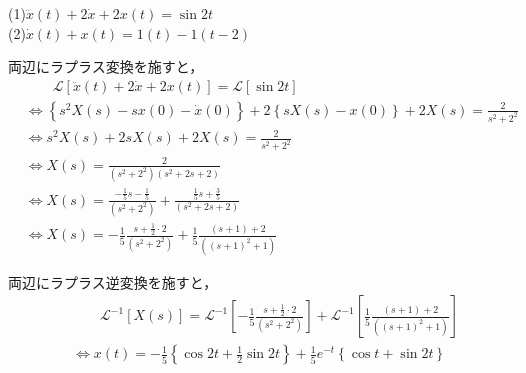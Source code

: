 \documentclass[a4paper,12pt]{article}
\begin{document}
(1)\quad \( \ddot{x}(t)+ 2\dot{x}+ 2x(t)= \sin 2t \)\\

(2)\quad \( \dot{x}(t)+ x(t)= 1(t)- 1(t-2) \)\\

\vspace{2mm}

\begin{tcolorbox}[title={6.(1) \( \ddot{x}(t)+ 2\dot{x}+ 2x(t)= \sin 2t \)
    }]
    \quad 両辺にラプラス変換を施すと，
    \vspace{-3mm}
    \begin{align*}
        &\qquad \mathcal{L}\left[ \ddot{x}(t)+ 2\dot{x}+ 2x(t) \right] 
        = \mathcal{L} \left[ \sin 2t \right] \\
        &\Leftrightarrow \left\{ s^2 X(s) - sx(0) - \dot{x}(0) \right\}
        + 2 \left\{ sX(s) - x(0) \right\}
        + 2 X(s) = \frac{2}{s^2+2^2}  \\
        &\Leftrightarrow s^2 X(s) + 2sX(s) + 2 X(s) = \frac{2}{s^2+2^2}  \\
        &\Leftrightarrow X(s) = \frac{2}{(s^2+2^2)(s^2+2s+2)}  \\
        &\Leftrightarrow X(s) = \frac{-\frac{1}{5}s-\frac{1}{5}}{(s^2+2^2)} + \frac{\frac{1}{5}s+\frac{3}{5}}{(s^2+2s+2)}\\
        &\Leftrightarrow X(s) = -\frac{1}{5} \frac{s+\frac{1}{2} \cdot 2}{(s^2+2^2)} + \frac{1}{5} \frac{(s+1)+2}{((s+1)^2+1)}
    \end{align*}
        
    \quad 両辺にラプラス逆変換を施すと，
    \vspace{-3mm}
    \begin{align*}
    &\qquad \mathcal{L}^{-1} \left[ X(s) \right] 
    = \mathcal{L}^{-1} \left[ -\frac{1}{5} \frac{s+\frac{1}{2} \cdot 2}{(s^2+2^2)}   \right] 
    + \mathcal{L}^{-1} \left[ \frac{1}{5} \frac{(s+1)+2}{((s+1)^2+1)}  \right] \\
    &\Leftrightarrow x(t) = -\frac{1}{5}\left\{ \cos 2t + \frac{1}{2} \sin 2t \right\}
    + \frac{1}{5}e^{-t}\left\{\cos t + \sin 2t\right\}
    \end{align*}
\end{tcolorbox}
\end{document}
